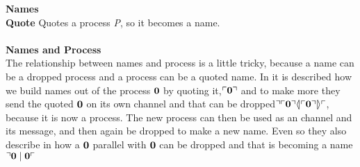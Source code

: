 \textbf{Names}\\ %
\textbf{Quote} Quotes a process \textit{P}, so it becomes a name. %
\\\\
\textbf{Names and Process}\\
The relationship between names and process is a little tricky, because a name can be a dropped process and a process can be a quoted name. In \citep{Meredith2005} it is described how we build names out of the process $\mathbf{0}$ by quoting it,$\ulcorner \mathbf{0} \urcorner$ and to make more they send the quoted $\mathbf{0}$ on its own channel and that can be dropped$\urcorner \ulcorner \mathbf{0} \urcorner \langle \! | \ulcorner \mathbf{0} \urcorner | \! \rangle \ulcorner$, because it is now a process. The new process can then be used as an channel and its message, and then again be dropped to make a new name. Even so they also describe in \citep{Meredith2005} how a $\mathbf{0}$ parallel with $\mathbf{0}$ can be dropped and that is becoming a name $\urcorner \mathbf{0} \mid \mathbf{0} \ulcorner$